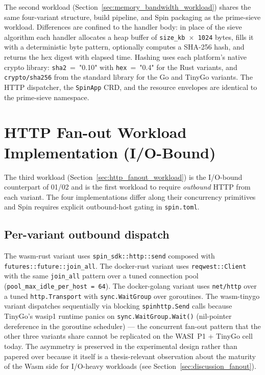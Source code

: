 \begin{sloppypar}
The second workload (Section~\ref{sec:memory_bandwidth_workload}) shares the same four-variant structure, build pipeline, and Spin packaging as the prime-sieve workload. Differences are confined to the handler body: in place of the sieve algorithm each handler allocates a heap buffer of \texttt{size\_kb~$\times$~1024} bytes, fills it with a deterministic byte pattern, optionally computes a \acs{SHA}-256 hash, and returns the hex digest with elapsed time. Hashing uses each platform's native crypto library: \texttt{sha2}~=~"0.10" with \texttt{hex}~=~"0.4" for the Rust variants, and \texttt{crypto/sha256} from the standard library for the Go and TinyGo variants. The \acs{HTTP} dispatcher, the \texttt{SpinApp} \acs{CRD}, and the resource envelopes are identical to the prime-sieve namespace.
\end{sloppypar}

\section{HTTP Fan-out Workload Implementation (I/O-Bound)}
\label{sec:impl_http_fanout}

\begin{sloppypar}
The third workload (Section~\ref{sec:http_fanout_workload}) is the I/O-bound counterpart of 01/02 and is the first workload to require \textit{outbound} \acs{HTTP} from each variant. The four implementations differ along their concurrency primitives and Spin requires explicit outbound-host gating in \texttt{spin.toml}.
\end{sloppypar}

\subsection{Per-variant outbound dispatch}

\begin{sloppypar}
The wasm-rust variant uses \texttt{spin\_sdk::http::send} composed with \texttt{futures::future::join\_all}. The docker-rust variant uses \texttt{reqwest::Client} with the same \texttt{join\_all} pattern over a tuned connection pool (\texttt{pool\_max\_idle\_per\_host~=~64}). The docker-golang variant uses \texttt{net/http} over a tuned \texttt{http.Transport} with \texttt{sync.WaitGroup} over goroutines. The wasm-tinygo variant dispatches sequentially via blocking \texttt{spinhttp.Send} calls because TinyGo's wasip1 runtime panics on \texttt{sync.WaitGroup.Wait()} (nil-pointer dereference in the goroutine scheduler) --- the concurrent fan-out pattern that the other three variants share cannot be replicated on the \acs{WASI}~P1 + TinyGo cell today. The asymmetry is preserved in the experimental design rather than papered over because it itself is a thesis-relevant observation about the maturity of the Wasm side for I/O-heavy workloads (see Section~\ref{sec:discussion_fanout}).
\end{sloppypar}

